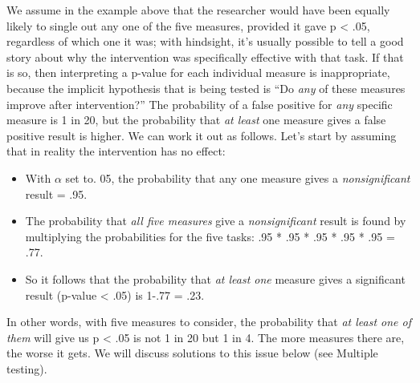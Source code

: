 \documentclass{krantz}
\providecommand{\tightlist}{%
\setlength{\itemsep}{0pt}\setlength{\parskip}{0pt}}
\begin{document}
We assume in the example above that the researcher would have been equally likely to single out any one of the five measures, provided it gave p \textless{} .05, regardless of which one it was; with hindsight, it's usually possible to tell a good story about why the intervention was specifically effective with that task. If that is so, then interpreting a p-value for each individual measure is inappropriate, because the implicit hypothesis that is being tested is ``Do \emph{any} of these measures improve after intervention?'' The probability of a false positive for \emph{any} specific measure is 1 in 20, but the probability that \emph{at least} one measure gives a false positive result is higher. We can work it out as follows. Let's start by assuming that in reality the intervention has no effect:

\begin{itemize}
\tightlist
\item
  With \(\alpha\) set to. 05, the probability that any one measure gives a \emph{nonsignificant} result = .95.
\item
  The probability that \emph{all five measures} give a \emph{nonsignificant} result is found by multiplying the probabilities for the five tasks: .95 * .95 * .95 * .95 * .95 = .77.
\item
  So it follows that the probability that \emph{at least one} measure gives a significant result (p-value \textless{} .05) is 1-.77 = .23.
\end{itemize}

In other words, with five measures to consider, the probability that \emph{at least one of them} will give us p \textless{} .05 is not 1 in 20 but 1 in 4. The more measures there are, the worse it gets. We will discuss solutions to this issue below (see Multiple testing).
\end{document}
